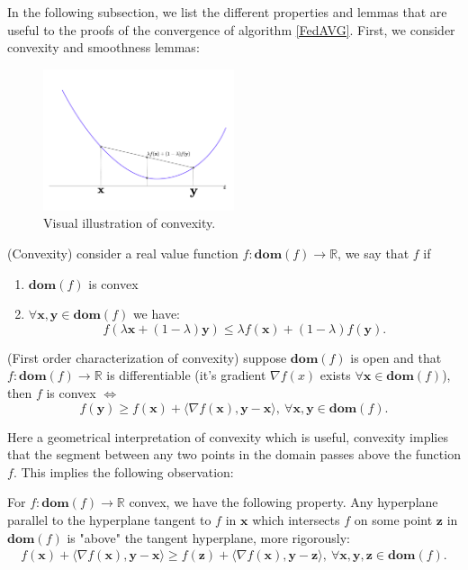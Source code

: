 In the following subsection, we list the different properties and lemmas that are useful to the proofs of the convergence of algorithm \ref{FedAVG}. First, we consider convexity and smoothness lemmas: 

\begin{figure}[h!]
    \centering
    \includegraphics[width=0.5\textwidth]{figures/convexity.pdf}
    \caption{Visual illustration of convexity.}
\end{figure}

\begin{property}
    (Convexity) consider a real value function $f:\bm{dom}(f)\rightarrow \mathbb{R}$, we say that $f$ if 
    \begin{enumerate}
        \item $\bm{dom}(f)$ is convex
        \item $\forall \bm{x},\bm{y} \in \bm{dom}(f)$ we have: 
        \[ f(\lambda \bm{x} + (1-\lambda) \bm{y}) \leq \lambda f(\bm{x}) + (1-\lambda) f(\bm{y}). \]
    \end{enumerate}
    \label{chord_convexity}
\end{property}


\begin{property}
    (First order characterization of convexity) suppose $\bm{dom}(f)$ is open and that $f:\bm{dom}(f) \rightarrow \mathbb{R}$ is differentiable (it's gradient $\nabla f(x)$ exists $\forall \bm{x} \in \bm{dom}(f)$), then $f$ is convex $\iff$
    \[ f(\bm{y}) \geq f(\bm{x}) + \langle \nabla f(\bm{x}) , \bm{y}-\bm{x} \rangle ,~  \forall \bm{x},\bm{y} \in \bm{dom}(f). \]
    \label{convexity}
\end{property}
\noindent


Here a geometrical interpretation of convexity which is useful, convexity implies that the segment between any two points in the domain passes above the function $f$. This implies the following observation:
\begin{observation}
    For $f:\bm{dom}(f) \rightarrow \mathbb{R}$ convex, we have the following property. Any hyperplane parallel to the hyperplane tangent to $f$ in $\bm{x}$ which intersects $f$ on some point $\bm{z}$ in $\bm{dom}(f)$ is "above" the tangent hyperplane, more rigorously:
    \begin{align*}
        f(\bm{x}) + \langle \nabla f(\bm{x}), \bm{y}-\bm{x} \rangle \geq  f(\bm{z}) + \langle \nabla f(\bm{x}), \bm{y}-\bm{z} \rangle, ~  \forall \bm{x},\bm{y} ,\bm{z} \in \bm{dom}(f). 
    \end{align*}
    \label{obs}
\end{observation}

